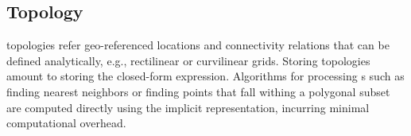 \subsection{\cgrid{} Topology}
\cgrid{} topologies refer geo-referenced locations and connectivity
relations that can be defined analytically, e.g., rectilinear or
curvilinear grids. Storing \cgrid{} topologies amount to storing the
closed-form expression. Algorithms for processing \cgrid{}s such as
finding nearest neighbors or finding points that fall withing a
polygonal subset are computed directly using the implicit \cgrid{}
representation, incurring minimal computational overhead.
